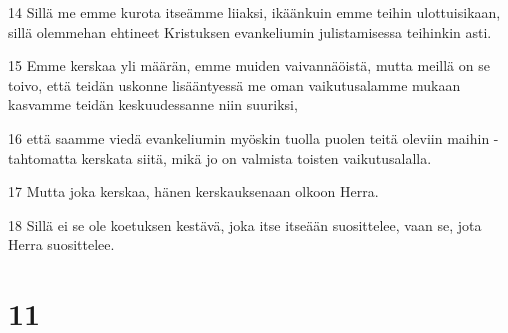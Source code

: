 \par 14 Sillä me emme kurota itseämme liiaksi, ikäänkuin emme teihin ulottuisikaan, sillä olemmehan ehtineet Kristuksen evankeliumin julistamisessa teihinkin asti.
\par 15 Emme kerskaa yli määrän, emme muiden vaivannäöistä, mutta meillä on se toivo, että teidän uskonne lisääntyessä me oman vaikutusalamme mukaan kasvamme teidän keskuudessanne niin suuriksi,
\par 16 että saamme viedä evankeliumin myöskin tuolla puolen teitä oleviin maihin - tahtomatta kerskata siitä, mikä jo on valmista toisten vaikutusalalla.
\par 17 Mutta joka kerskaa, hänen kerskauksenaan olkoon Herra.
\par 18 Sillä ei se ole koetuksen kestävä, joka itse itseään suosittelee, vaan se, jota Herra suosittelee.

\chapter{11}

